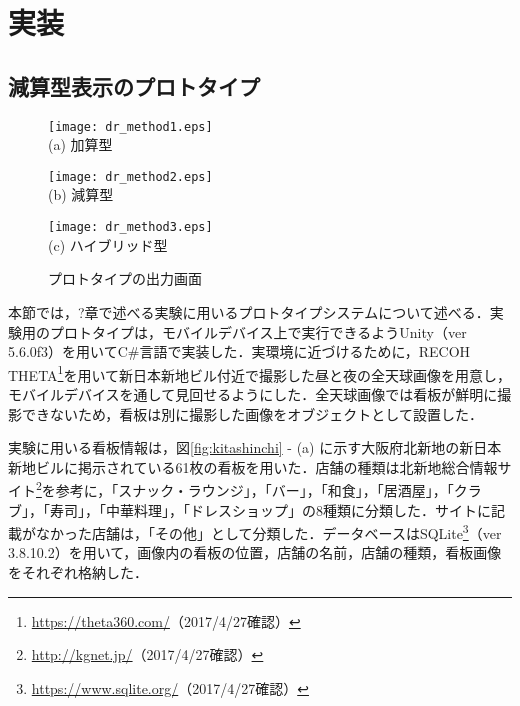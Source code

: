 \chapter{実装}
\label{chapter:proposal}

\section{減算型表示のプロトタイプ}
  \begin{figure}[t]
    \begin{center}
    \begin{minipage}{0.3\hsize}
        \begin{center}
            \texttt{[image: dr\_method1.eps]}\\
            \small{(a) 加算型}
        \end{center}
    \end{minipage}
    \begin{minipage}{0.3\hsize}
        \begin{center}
            \texttt{[image: dr\_method2.eps]}\\
            \small{(b) 減算型}
        \end{center}
    \end{minipage}
    \begin{minipage}{0.3\hsize}
        \begin{center}
            \texttt{[image: dr\_method3.eps]}\\
            \small{(c) ハイブリッド型}
        \end{center}
    \end{minipage}
    \end{center}
    \vspace{1pt}
    \caption{プロトタイプの出力画面}
    \label{fig:prototype}
  \end{figure}
  本節では，?章で述べる実験に用いるプロトタイプシステムについて述べる．実験用のプロトタイプは，モバイルデバイス上で実行できるようUnity（ver 5.6.0f3）を用いてC\#言語で実装した．実環境に近づけるために，RECOH THETA\footnote{\url{https://theta360.com/}（2017/4/27確認）}を用いて新日本新地ビル付近で撮影した昼と夜の全天球画像を用意し，モバイルデバイスを通して見回せるようにした．全天球画像では看板が鮮明に撮影できないため，看板は別に撮影した画像をオブジェクトとして設置した．

  実験に用いる看板情報は，図\ref{fig:kitashinchi} - (a) に示す大阪府北新地の新日本新地ビルに掲示されている61枚の看板を用いた．店舗の種類は北新地総合情報サイト\footnote{\url{http://kgnet.jp/}（2017/4/27確認）}を参考に，「スナック・ラウンジ」，「バー」，「和食」，「居酒屋」，「クラブ」，「寿司」，「中華料理」，「ドレスショップ」の8種類に分類した．サイトに記載がなかった店舗は，「その他」として分類した．データベースはSQLite\footnote{\url{https://www.sqlite.org/}（2017/4/27確認）}（ver 3.8.10.2）を用いて，画像内の看板の位置，店舗の名前，店舗の種類，看板画像をそれぞれ格納した．

